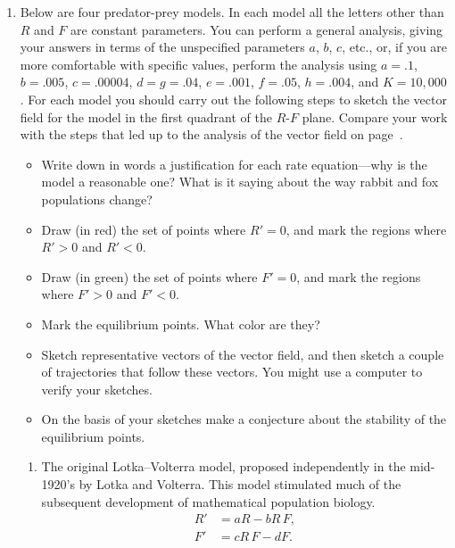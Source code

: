 \begin{enumerate}
\item Below are four predator-prey models.  In each model all the
letters other than $R$ and $F$ are constant parameters.  You can
perform a general analysis, giving your answers in terms of the
unspecified parameters $a$, $b$, $c$, etc., or, if you are more
comfortable with specific values, perform the analysis using $a=.1$,
$b=.005$, $c=.00004$, $d=g=.04$, $e=.001$, $f=.05$, $h=.004$, and
$K=10,000$.  For each model you should carry out the following steps
to sketch the vector field for the model in the first quadrant of the
$R$-$F$ plane.  Compare your work with the steps that led up to the
analysis of the vector field on page~\pageref{`equilibrium'}.
\begin{itemize}

\item Write down in words a justification for each rate equation---why
  is the model a reasonable one?  What is it saying about the way
  rabbit and fox populations change?

\item Draw (in red) the set of points where $R' = 0$, and mark the
  regions where $R' > 0$ and $R' < 0$.

\item Draw (in green) the set of points where $F' = 0$, and mark the
  regions where $F' > 0$ and $F' < 0$.

\item  Mark the equilibrium points.  What color are they?

\item Sketch representative vectors of the vector field, and then
  sketch a couple of trajectories that follow these vectors.  You
  might use a computer to verify your sketches.

\item On the basis of your sketches make a conjecture about the
  stability of the equilibrium points.

\end{itemize}


  \begin{enumerate}
  \item The original Lotka--Volterra model, proposed independently in the
mid-1920's by Lotka and Volterra.  This
model stimulated much of the subsequent development of mathematical
population biology.
\begin{align*}
R' &= aR-bR\,F, \\
F' &= cR\,F-dF.
\end{align*}



\end{enumerate}
\end{enumerate}
